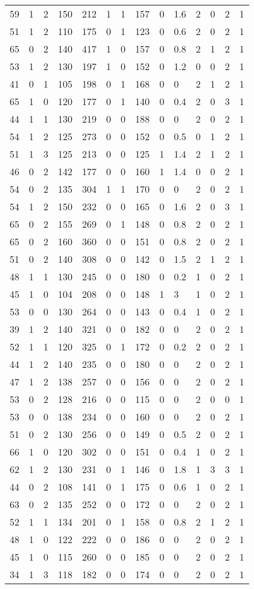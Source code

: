 \documentclass{article}
\begin{document}
\begin{longtable}{|l|l|l|l|l|l|l|l|l|l|l|l|l|l|}
59&1&2&150&212&1&1&157&0&1.6&2&0&2&1 \\ 
51&1&2&110&175&0&1&123&0&0.6&2&0&2&1 \\ 
65&0&2&140&417&1&0&157&0&0.8&2&1&2&1 \\ 
53&1&2&130&197&1&0&152&0&1.2&0&0&2&1 \\ 
41&0&1&105&198&0&1&168&0&0&2&1&2&1 \\ 
65&1&0&120&177&0&1&140&0&0.4&2&0&3&1 \\ 
44&1&1&130&219&0&0&188&0&0&2&0&2&1 \\ 
54&1&2&125&273&0&0&152&0&0.5&0&1&2&1 \\ 
51&1&3&125&213&0&0&125&1&1.4&2&1&2&1 \\ 
46&0&2&142&177&0&0&160&1&1.4&0&0&2&1 \\ 
54&0&2&135&304&1&1&170&0&0&2&0&2&1 \\ 
54&1&2&150&232&0&0&165&0&1.6&2&0&3&1 \\ 
65&0&2&155&269&0&1&148&0&0.8&2&0&2&1 \\ 
65&0&2&160&360&0&0&151&0&0.8&2&0&2&1 \\ 
51&0&2&140&308&0&0&142&0&1.5&2&1&2&1 \\ 
48&1&1&130&245&0&0&180&0&0.2&1&0&2&1 \\ 
45&1&0&104&208&0&0&148&1&3&1&0&2&1 \\ 
53&0&0&130&264&0&0&143&0&0.4&1&0&2&1 \\ 
39&1&2&140&321&0&0&182&0&0&2&0&2&1 \\ 
52&1&1&120&325&0&1&172&0&0.2&2&0&2&1 \\ 
44&1&2&140&235&0&0&180&0&0&2&0&2&1 \\ 
47&1&2&138&257&0&0&156&0&0&2&0&2&1 \\ 
53&0&2&128&216&0&0&115&0&0&2&0&0&1 \\ 
53&0&0&138&234&0&0&160&0&0&2&0&2&1 \\ 
51&0&2&130&256&0&0&149&0&0.5&2&0&2&1 \\ 
66&1&0&120&302&0&0&151&0&0.4&1&0&2&1 \\ 
62&1&2&130&231&0&1&146&0&1.8&1&3&3&1 \\ 
44&0&2&108&141&0&1&175&0&0.6&1&0&2&1 \\ 
63&0&2&135&252&0&0&172&0&0&2&0&2&1 \\ 
52&1&1&134&201&0&1&158&0&0.8&2&1&2&1 \\ 
48&1&0&122&222&0&0&186&0&0&2&0&2&1 \\ 
45&1&0&115&260&0&0&185&0&0&2&0&2&1 \\ 
34&1&3&118&182&0&0&174&0&0&2&0&2&1 \\ 

\end{longtable}
\end{document}
